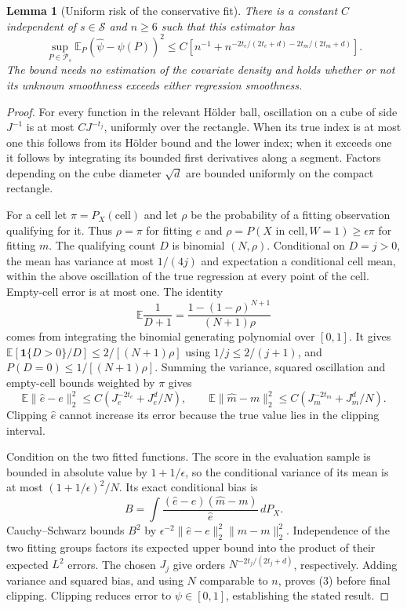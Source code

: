 \documentclass[11pt]{article}
\newtheorem{lemma}[theorem]{Lemma}
\theoremstyle{remark}
\newcommand{\E}{\mathbb E}
\newcommand{\Ind}{\mathbf 1}
\begin{document}
\begin{lemma}[Uniform risk of the conservative fit]
There is a constant $C$ independent of $s\in\mathcal S$ and $n\geq6$
such that this estimator has
\[
 \sup_{P\in\mathcal P_s}\E_P(\widehat\psi-\psi(P))^2
 \leq C\left[n^{-1}+
 n^{-2t_e/(2t_e+d)-2t_m/(2t_m+d)}\right]. \tag{3}
\]
The bound needs no estimation of the covariate density and holds whether
or not its unknown smoothness exceeds either regression smoothness.
\end{lemma}
\begin{proof}
For every function in the relevant H\"older ball, oscillation on a cube
of side $J^{-1}$ is at most $C J^{-t_j}$, uniformly over the rectangle.
When its true index is at most one this follows from its H\"older bound
and the lower index; when it exceeds one it follows by integrating its
bounded first derivatives along a segment. Factors depending on the
cube diameter $\sqrt d$ are bounded uniformly on the compact rectangle.

For a cell let $\pi=P_X(\text{cell})$ and let $\rho$ be the probability
of a fitting observation qualifying for it. Thus $\rho=\pi$ for fitting
$e$ and $\rho=P(X\text{ in cell},W=1)\geq\epsilon\pi$ for fitting
$m$. The qualifying count $D$ is binomial $(N,\rho)$. Conditional on
$D=j>0$, the mean has variance at most $1/(4j)$ and expectation a
conditional cell mean, within the above oscillation of the true
regression at every point of the cell. Empty-cell error is at most one.
The identity
\[
 \E\frac1{D+1}=\frac{1-(1-\rho)^{N+1}}{(N+1)\rho}
\]
comes from integrating the binomial generating polynomial over $[0,1]$.
It gives $\E[\Ind\{D>0\}/D]\leq2/[(N+1)\rho]$ using
$1/j\leq2/(j+1)$, and
$P(D=0)\leq1/[(N+1)\rho]$. Summing the variance, squared oscillation
and empty-cell bounds weighted by $\pi$ gives
\[
 \E\|\widehat e-e\|_2^2\leq C(J_e^{-2t_e}+J_e^d/N),\qquad
 \E\|\widehat m-m\|_2^2\leq C(J_m^{-2t_m}+J_m^d/N).
\]
Clipping $\widehat e$ cannot increase its error because the true value
lies in the clipping interval.

Condition on the two fitted functions. The score in the evaluation
sample is bounded in absolute value by $1+1/\epsilon$, so the conditional
variance of its mean is at most $(1+1/\epsilon)^2/N$. Its exact
conditional bias is
\[
 B=\int\frac{(\widehat e-e)(\widehat m-m)}{\widehat e}\,dP_X.
\]
Cauchy--Schwarz bounds $B^2$ by
$\epsilon^{-2}\|\widehat e-e\|_2^2\|\widehat m-m\|_2^2$.
Independence of the two fitting groups factors its expected upper bound
into the product of their expected $L^2$ errors. The chosen $J_j$ give
orders $N^{-2t_j/(2t_j+d)}$, respectively. Adding variance and squared
bias, and using $N$ comparable to $n$, proves (3) before final clipping.
Clipping reduces error to $\psi\in[0,1]$, establishing the stated result.
\end{proof}
\end{document}
